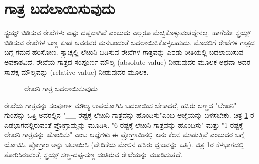 \section{ಗಾತ್ರ ಬದಲಾಯಿಸುವುದು}
ಸ್ಪ್ರಯ್ಟ್ ಬಿಡಿಸುವ ರೇಖೆಗಳು ಎಷ್ಟು ದಪ್ಪದಾಗಿವೆ ಎಂಬುದು ಎಲ್ಲರೂ ಮೆಚ್ಚಿಕೊಳ್ಳುವಂತದ್ದೇನಲ್ಲ. ಹಾಗೆಯೇ ಸ್ಪ್ರಯ್ಟ್ ಬಿಡಿಸುವ ರೇಖೆಗಳ ಬಣ್ಣ ಕೂಡ ಅವರವರ ಮನಬಂದಂತೆ ಬದಲಾಯಿಸಿಕೊಳ್ಳಬಹುದು.  ಮೊದಲಿಗೆ ರೇಖೆಗಳ ಗಾತ್ರದ ಬಗ್ಗೆ ಗಮನ ಹರಿಸೋಣ. ಸ್ಕ್ರಾಚ್ನಲ್ಲಿ ಲೇಖನಿ ಬಿಡಿಸುವ ರೇಖೆಗಳ ಗಾತ್ರವನ್ನು ಎರಡು ರೀತಿಯಲ್ಲಿ  ಬದಲಾಯಿಸುವ ಅವಕಾಶವಿದೆ.  ರೇಖೆಯ ಗಾತ್ರದ ಸಂಪೂರ್ಣ ಮೌಲ್ಯ (\textenglish{absolute value}) ನೀಡುವುದರ ಮೂಲಕ ಅಥವಾ ಅದರ ಸಾಪೆಕ್ಷ ಮೌಲ್ಯವನ್ನು (\textenglish{relative value}) ನೀಡುವುದರ ಮೂಲಕ. 

\begin{figure}[h]
\begin{center}
\begin{multicols}{2}
\begin{Scratch}[1]
\beginbox{}
\end{Scratch}


\end{multicols}

\end{center}
\caption{ಲೇಖನಿ ಗಾತ್ರ ಬದಲಾಯಿಸುವುದು}
\label{pen_linewidth}
\end{figure}
ರೇಖೆಯ ಗಾತ್ರವನ್ನು ಸಂಪೂರ್ಣ ಮೌಲ್ಯ ಉಪಯೋಗಿಸಿ ಬದಲಾಯಿಸ ಬೇಕಾದರೆ,  ಹಸಿರು ಬಣ್ಣದ "ಲೇಖನಿ" ಗುಂಪನ್ನು ಒತ್ತಿ ಅದರಲ್ಲಿನ "\_\_ ರಷ್ಟಕ್ಕೆ ಲೇಖನಿ ಗಾತ್ರವನ್ನು ಹೊಂದಿಸು"ಎಂಬ 
ಆಜ್ಞೆಯನ್ನು ಬಳಸಬೇಕು.  ಚಿತ್ರ \ref{pen_linewidth} ರ ಎಡಭಾಗದಲ್ಲಿರುವಂತೆ ಪ್ರೋಗ್ರಾಮ್ಮನ್ನು ಮೂಡಿಸಿ.  "6 ರಷ್ಟಕ್ಕೆ ಲೇಖನಿ ಗಾತ್ರವನ್ನು ಹೊಂದಿಸು" ಮತ್ತು "1 ರಷ್ಟಕ್ಕೆ ಲೇಖನಿ ಗಾತ್ರವನ್ನು ಹೊಂದಿಸು" ಎಂಬ  ಆಜ್ಞೆಗಳು ಈ ಪ್ರೋಗ್ರಾಮಿನಲ್ಲಿ ಏನು ಕೆಲಸ ಮಾಡುತ್ತಿವೆ ಎಂಬುದರ ಬಗ್ಗೆ ಯೋಚಿಸಿ.  ಪ್ರೋಗ್ರಾಂ ಅನ್ನು  ಚಲಾಯಿಸಿ (ವೇದಿಕೆಯ ಮೇಲಿನ ಹಸಿರು ಧ್ವಜವನ್ನು ಒತ್ತಿ).  ಚಿತ್ರ \ref{pen_linewidth}ರ ಕೆಳಭಾಗದಲ್ಲಿ ತೋರಿಸಿರುವಂತೆ, ಸ್ಪ್ರಯ್ಟ್ ಸಣ್ಣ-ದಪ್ಪ-ಸಣ್ಣ ದಂತಿರುವ ರೇಖೆಯನ್ನು ಮೂಡಿಸುತ್ತದೆ.

